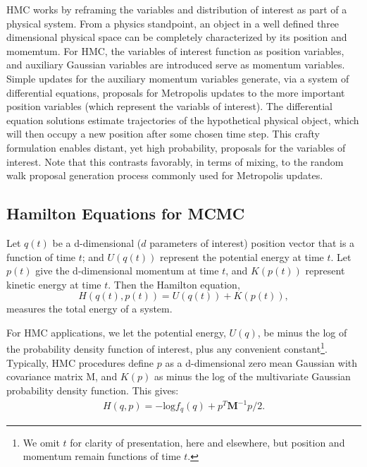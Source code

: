 \documentclass{article}
\begin{document}
HMC works by reframing the variables and distribution of interest as part of a physical system. From a physics standpoint, an object in a well defined three dimensional physical space can be completely characterized by its position and momemtum. For HMC, the variables of interest function as position variables, and auxiliary Gaussian variables are introduced serve as momentum variables. Simple updates for the auxiliary momentum variables generate, via a system of differential equations, proposals for Metropolis updates to the more important position variables (which represent the variabls of interest). The differential equation solutions estimate trajectories of the hypothetical physical object, which will then occupy a new position after some chosen time step. This crafty formulation enables distant, yet high probability, proposals for the variables of interest. Note that this contrasts favorably, in terms of mixing, to the random walk proposal generation process commonly used for Metropolis updates.

\subsection{Hamilton Equations for MCMC} %

Let $q(t)$ be a d-dimensional ($d$ parameters of interest) position vector that is a function of time $t$; and $U(q(t))$ represent the potential energy at time $t$. Let $p(t)$ give the d-dimensional momentum at time $t$, and $K(p(t))$ represent kinetic energy at time $t$. Then the Hamilton equation,
\begin{equation}
H(q(t),p(t)) = U(q(t)) + K(p(t)),
\end{equation}
measures the total energy of a system. 

For HMC applications, we let the potential energy, $U(q)$, be minus the log of the probability density function of interest, plus any convenient constant\footnote{We omit $t$ for clarity of presentation, here and elsewhere, but position and momentum remain functions of time $t$.}. Typically, HMC procedures define $p$ as a d-dimensional zero mean Gaussian with covariance matrix M, and $K(p)$ as minus the log of the multivariate Gaussian probability density function. This gives:
\begin{align}
H(q,p) = -\text{log}f_{q}(q) + p^{T}\pmb{M}^{-1}p/2.
\end{align}
\end{document}
